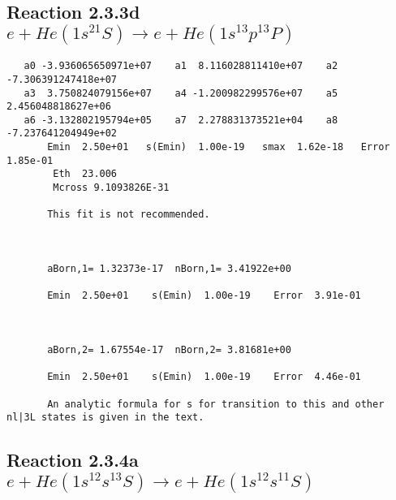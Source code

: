 \documentclass[12pt,dvipdfmx]{article}
\begin{document}
\newpage
\subsection{
Reaction 2.3.3d $e + He(1s^21S) \rightarrow e + He(1s^13p^13P)$}

















\begin{small}\begin{verbatim}
   a0 -3.936065650971e+07    a1  8.116028811410e+07    a2 -7.306391247418e+07
   a3  3.750824079156e+07    a4 -1.200982299576e+07    a5  2.456048818627e+06
   a6 -3.132802195794e+05    a7  2.278831373521e+04    a8 -7.237641204949e+02
       Emin  2.50e+01   s(Emin)  1.00e-19   smax  1.62e-18   Error  1.85e-01
        Eth  23.006
        Mcross 9.1093826E-31

       This fit is not recommended.



       aBorn,1= 1.32373e-17  nBorn,1= 3.41922e+00

       Emin  2.50e+01    s(Emin)  1.00e-19    Error  3.91e-01



       aBorn,2= 1.67554e-17  nBorn,2= 3.81681e+00

       Emin  2.50e+01    s(Emin)  1.00e-19    Error  4.46e-01

       An analytic formula for s for transition to this and other nl|3L states is given in the text.
\end{verbatim}\end{small}




\newpage
\subsection{
Reaction 2.3.4a $e + He(1s^12s^13S) \rightarrow e + He(1s^12s^11S)$}






\end{document}
